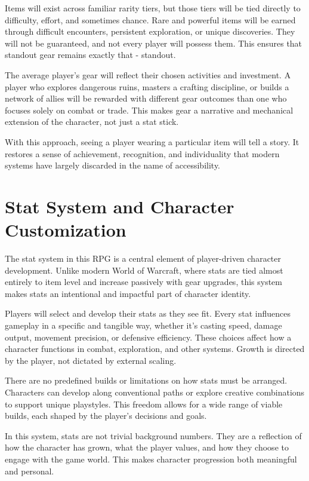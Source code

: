 Items will exist across familiar rarity tiers, but those tiers will be tied directly to difficulty, effort, and sometimes chance. Rare and powerful items will be earned through difficult encounters, persistent exploration, or unique discoveries. They will not be guaranteed, and not every player will possess them. This ensures that standout gear remains exactly that - standout.

The average player's gear will reflect their chosen activities and investment. A player who explores dangerous ruins, masters a crafting discipline, or builds a network of allies will be rewarded with different gear outcomes than one who focuses solely on combat or trade. This makes gear a narrative and mechanical extension of the character, not just a stat stick.

With this approach, seeing a player wearing a particular item will tell a story. It restores a sense of achievement, recognition, and individuality that modern systems have largely discarded in the name of accessibility.







\section{Stat System and Character Customization}

The stat system in this RPG is a central element of player-driven character development. Unlike modern World of Warcraft, where stats are tied almost entirely to item level and increase passively with gear upgrades, this system makes stats an intentional and impactful part of character identity.

Players will select and develop their stats as they see fit. Every stat influences gameplay in a specific and tangible way, whether it's casting speed, damage output, movement precision, or defensive efficiency. These choices affect how a character functions in combat, exploration, and other systems. Growth is directed by the player, not dictated by external scaling.

There are no predefined builds or limitations on how stats must be arranged. Characters can develop along conventional paths or explore creative combinations to support unique playstyles. This freedom allows for a wide range of viable builds, each shaped by the player's decisions and goals.

In this system, stats are not trivial background numbers. They are a reflection of how the character has grown, what the player values, and how they choose to engage with the game world. This makes character progression both meaningful and personal.

